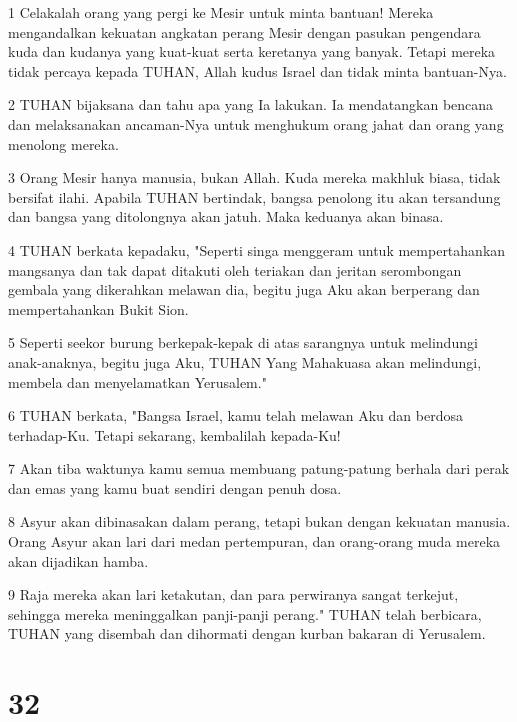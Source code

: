 \par 1 Celakalah orang yang pergi ke Mesir untuk minta bantuan! Mereka mengandalkan kekuatan angkatan perang Mesir dengan pasukan pengendara kuda dan kudanya yang kuat-kuat serta keretanya yang banyak. Tetapi mereka tidak percaya kepada TUHAN, Allah kudus Israel dan tidak minta bantuan-Nya.
\par 2 TUHAN bijaksana dan tahu apa yang Ia lakukan. Ia mendatangkan bencana dan melaksanakan ancaman-Nya untuk menghukum orang jahat dan orang yang menolong mereka.
\par 3 Orang Mesir hanya manusia, bukan Allah. Kuda mereka makhluk biasa, tidak bersifat ilahi. Apabila TUHAN bertindak, bangsa penolong itu akan tersandung dan bangsa yang ditolongnya akan jatuh. Maka keduanya akan binasa.
\par 4 TUHAN berkata kepadaku, "Seperti singa menggeram untuk mempertahankan mangsanya dan tak dapat ditakuti oleh teriakan dan jeritan serombongan gembala yang dikerahkan melawan dia, begitu juga Aku akan berperang dan mempertahankan Bukit Sion.
\par 5 Seperti seekor burung berkepak-kepak di atas sarangnya untuk melindungi anak-anaknya, begitu juga Aku, TUHAN Yang Mahakuasa akan melindungi, membela dan menyelamatkan Yerusalem."
\par 6 TUHAN berkata, "Bangsa Israel, kamu telah melawan Aku dan berdosa terhadap-Ku. Tetapi sekarang, kembalilah kepada-Ku!
\par 7 Akan tiba waktunya kamu semua membuang patung-patung berhala dari perak dan emas yang kamu buat sendiri dengan penuh dosa.
\par 8 Asyur akan dibinasakan dalam perang, tetapi bukan dengan kekuatan manusia. Orang Asyur akan lari dari medan pertempuran, dan orang-orang muda mereka akan dijadikan hamba.
\par 9 Raja mereka akan lari ketakutan, dan para perwiranya sangat terkejut, sehingga mereka meninggalkan panji-panji perang." TUHAN telah berbicara, TUHAN yang disembah dan dihormati dengan kurban bakaran di Yerusalem.

\chapter{32}

